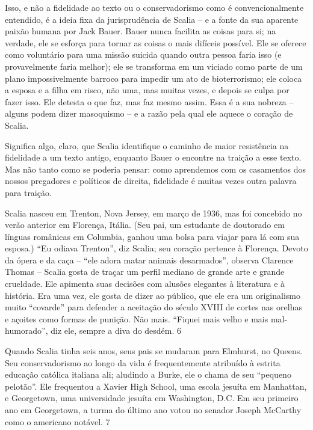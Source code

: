  
\par
 
Isso, e não a fidelidade ao texto ou o conservadorismo como é convencionalmente entendido, é a ideia fixa da jurisprudência de Scalia – e a fonte da sua aparente paixão humana por Jack Bauer. Bauer nunca facilita as coisas para si; na verdade, ele se esforça para tornar as coisas o mais difíceis possível. Ele se oferece como voluntário para uma missão suicida quando outra pessoa faria isso (e provavelmente faria melhor); ele se transforma em um viciado como parte de um plano impossivelmente barroco para impedir um ato de bioterrorismo; ele coloca a esposa e a filha em risco, não uma, mas muitas vezes, e depois se culpa por fazer isso. Ele detesta o que faz, mas faz mesmo assim. Essa é a sua nobreza – alguns podem dizer masoquismo – e a razão pela qual ele aquece o coração de Scalia.
 
\par
 
Significa algo, claro, que Scalia identifique o caminho de maior resistência na fidelidade a um texto antigo, enquanto Bauer o encontre na traição a esse texto. Mas não tanto como se poderia pensar: como aprendemos com os casamentos dos nossos pregadores e políticos de direita, fidelidade é muitas vezes outra palavra para traição.
 
\par
 
Scalia nasceu em Trenton, Nova Jersey, em março de 1936, mas foi concebido no verão anterior em Florença, Itália. (Seu pai, um estudante de doutorado em línguas românicas em Columbia, ganhou uma bolsa para viajar para lá com sua esposa.) “Eu odiava Trenton”, diz Scalia; seu coração pertence à Florença. Devoto da ópera e da caça – “ele adora matar animais desarmados”, observa Clarence Thomas – Scalia gosta de traçar um perfil mediano de grande arte e grande crueldade. Ele apimenta suas decisões com alusões elegantes à literatura e à história. Era uma vez, ele gosta de dizer ao público, que ele era um originalismo muito “covarde” para defender a aceitação do século XVIII de cortes nas orelhas e açoites como formas de punição. Não mais. “Fiquei mais velho e mais mal-humorado”, diz ele, sempre a diva do desdém.
 {\color{blue} 6}  

 
\par
 
Quando Scalia tinha seis anos, seus pais se mudaram para Elmhurst, no Queens. Seu conservadorismo ao longo da vida é frequentemente atribuído à estrita educação católica italiana ali; aludindo a Burke, ele o chama de seu “pequeno pelotão”. Ele frequentou a Xavier High School, uma escola jesuíta em Manhattan, e Georgetown, uma universidade jesuíta em Washington, D.C. Em seu primeiro ano em Georgetown, a turma do último ano votou no senador Joseph McCarthy como o americano notável.
 {\color{blue} 7}  


